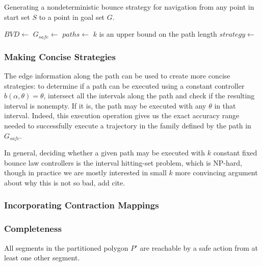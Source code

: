 \documentclass[]{styles/svproc}  %
\begin{document}
\begin{algorithm}
\caption{Generating a nondeterministic bounce strategy for navigation from any
point in start set $S$ to a point in goal set $G$.}
\label{algo:nav}

\begin{algorithmic}
\State $BVD \gets$ 
\State $G_{safe} \gets$ 
\State $paths \gets$ 
\Comment $k$ is an upper bound on the path length
\State $strategy \gets$ 
\EndProcedure
\end{algorithmic}
\end{algorithm}

\subsubsection{Making Concise Strategies}

The edge
information along the path can be used to create more concise strategies: to
determine if a path can be executed using a constant controller $b(\alpha,
\theta) = \theta$, intersect all the intervals along the path and check if the
resulting interval is nonempty. If it is, the path may be executed with any
$\theta$ in that interval. Indeed, this execution operation gives us the exact
accuracy range needed to successfully execute a trajectory in the family defined
by the path in $G_{safe}$.


In general, deciding whether a given path may be
executed with $k$ constant fixed bounce law controllers is the interval
hitting-set problem, which is NP-hard, though in practice we are mostly
interested in small $k$ {\color{red} more convincing argument about why this is not so
bad, add cite}.

\subsubsection{Incorporating Contraction Mappings}



\subsubsection{Completeness}

\begin{conjecture}
All segments in the partitioned polygon $P'$ are reachable by a safe action from
at least one other segment.
\end{conjecture}
\end{document}
